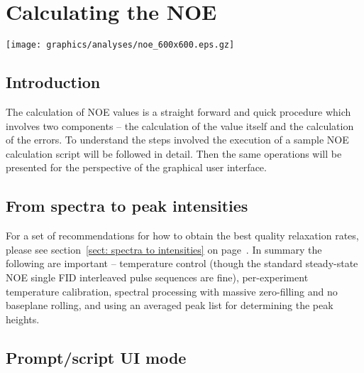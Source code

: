 
\chapter{Calculating the NOE} \label{ch: NOE}


\begin{figure*}[h]
\texttt{[image: graphics/analyses/noe\_600x600.eps.gz]}
\end{figure*}



\section{Introduction}

The calculation of NOE values is a straight forward and quick procedure which involves two components -- the calculation of the value itself and the calculation of the errors.  To understand the steps involved the execution of a sample NOE calculation script will be followed in detail.  Then the same operations will be presented for the perspective of the graphical user interface.




\section{From spectra to peak intensities}

For a set of recommendations for how to obtain the best quality relaxation rates, please see section~\ref{sect: spectra to intensities} on page~\pageref{sect: spectra to intensities}.  In summary the following are important -- temperature control (though the standard steady-state NOE single FID interleaved pulse sequences are fine), per-experiment temperature calibration, spectral processing with massive zero-filling and no baseplane rolling, and using an averaged peak list for determining the peak heights.



\section{Prompt/script UI mode}



